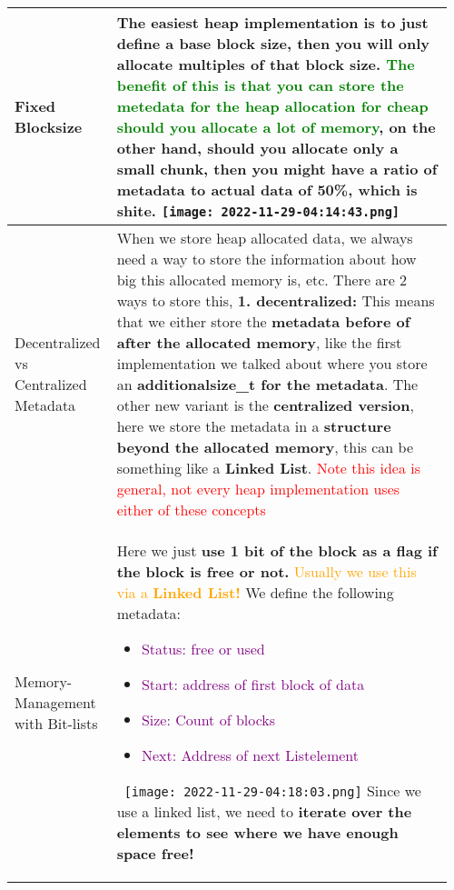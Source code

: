 \documentclass[main.tex,fontsize=8pt,paper=a4,paper=portrait,DIV=calc,]{scrartcl}
\begin{document}
\begin{table}[ht!]
\begin{tabular}{|m{0.2\linewidth}|m{0.755\linewidth}|}
\hline
Fixed Blocksize & 
The easiest heap implementation is to just define a \textbf{base block size}, then you will only allocate multiples of that block size.\newline
\textcolor{green}{The benefit of this is that you can store the metedata for the heap allocation for cheap should you allocate a lot of memory}, on the other hand, should you allocate only a small chunk, then you might have a ratio of metadata to actual data of 50\%, which is shite.\newline
\texttt{[image: 2022-11-29-04:14:43.png]} \newline
\\
\hline
Decentralized vs Centralized Metadata & 
When we store heap allocated data, we always need a way to store the information about how big this allocated memory is, etc.\newline
There are 2 ways to store this, \textbf{1. decentralized:}\newline
This means that we either store the \textbf{metadata before of after the allocated memory}, like the first implementation we talked about where you store an \textbf{additionalsize\_t for the metadata}.\newline
The other new variant is the \textbf{centralized version}, here we store the metadata in a \textbf{structure beyond the allocated memory}, this can be something like a \textbf{Linked List}. \newline
\textcolor{red}{Note this idea is general, not every heap implementation uses either of these concepts}\\
\hline
Memory-Management with Bit-lists & 
Here we just \textbf{use 1 bit of the block as a flag if the block is free or not.}\newline
\textcolor{orange}{Usually we use this via a \textbf{Linked List!}}\newline
We define the following metadata:\newline
\begin{itemize}
\item \textcolor{purple}{Status: free or used}
\item \textcolor{purple}{Start: address of first block of data}
\item \textcolor{purple}{Size: Count of blocks}
\item \textcolor{purple}{Next: Address of next Listelement}
\end{itemize} 
\, \newline
\texttt{[image: 2022-11-29-04:18:03.png]}\newline
Since we use a linked list, we need to \textbf{iterate over the elements to see where we have enough space free!}\\
\hline
\end{tabular}
\end{table}
\end{document}
